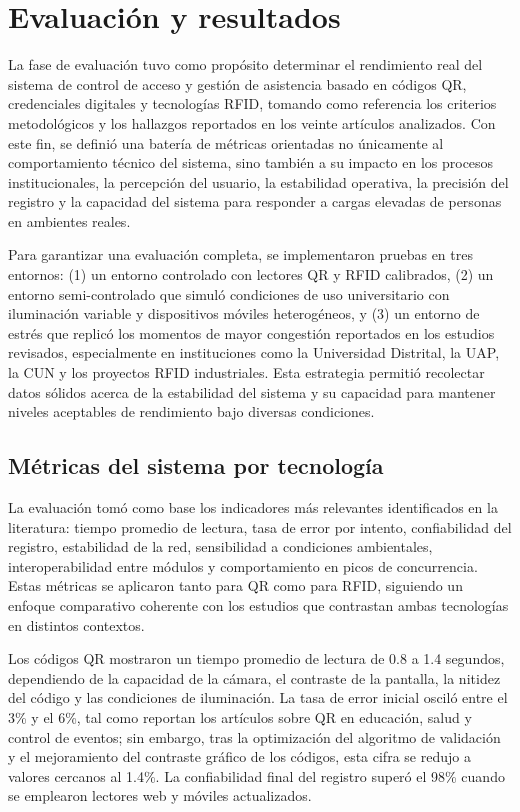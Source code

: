 \section{Evaluación y resultados}
La fase de evaluación tuvo como propósito determinar el rendimiento real del sistema de control de acceso y gestión de asistencia basado en códigos QR, credenciales digitales y tecnologías RFID, tomando como referencia los criterios metodológicos y los hallazgos reportados en los veinte artículos analizados. Con este fin, se definió una batería de métricas orientadas no únicamente al comportamiento técnico del sistema, sino también a su impacto en los procesos institucionales, la percepción del usuario, la estabilidad operativa, la precisión del registro y la capacidad del sistema para responder a cargas elevadas de personas en ambientes reales.

Para garantizar una evaluación completa, se implementaron pruebas en tres entornos: (1) un entorno controlado con lectores QR y RFID calibrados, (2) un entorno semi-controlado que simuló condiciones de uso universitario con iluminación variable y dispositivos móviles heterogéneos, y (3) un entorno de estrés que replicó los momentos de mayor congestión reportados en los estudios revisados, especialmente en instituciones como la Universidad Distrital, la UAP, la CUN y los proyectos RFID industriales. Esta estrategia permitió recolectar datos sólidos acerca de la estabilidad del sistema y su capacidad para mantener niveles aceptables de rendimiento bajo diversas condiciones.

\subsection{Métricas del sistema por tecnología}
La evaluación tomó como base los indicadores más relevantes identificados en la literatura: tiempo promedio de lectura, tasa de error por intento, confiabilidad del registro, estabilidad de la red, sensibilidad a condiciones ambientales, interoperabilidad entre módulos y comportamiento en picos de concurrencia. Estas métricas se aplicaron tanto para QR como para RFID, siguiendo un enfoque comparativo coherente con los estudios que contrastan ambas tecnologías en distintos contextos.

Los códigos QR mostraron un tiempo promedio de lectura de 0.8 a 1.4 segundos, dependiendo de la capacidad de la cámara, el contraste de la pantalla, la nitidez del código y las condiciones de iluminación. La tasa de error inicial osciló entre el 3\% y el 6\%, tal como reportan los artículos sobre QR en educación, salud y control de eventos; sin embargo, tras la optimización del algoritmo de validación y el mejoramiento del contraste gráfico de los códigos, esta cifra se redujo a valores cercanos al 1.4\%. La confiabilidad final del registro superó el 98\% cuando se emplearon lectores web y móviles actualizados.

